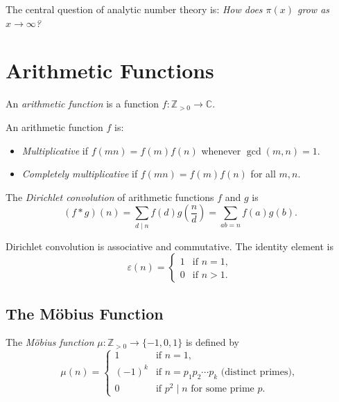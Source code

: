 The central question of analytic number theory is: \emph{How does $\pi(x)$ grow as $x \to \infty$?}

\section{Arithmetic Functions}

\begin{definition}
  An \emph{arithmetic function} is a function $f : \mathbb{Z}_{>0} \to \mathbb{C}$.
\end{definition}

\begin{definition}
  An arithmetic function $f$ is:
  \begin{itemize}
    \item \emph{Multiplicative} if $f(mn) = f(m)f(n)$ whenever $\gcd(m,n) = 1$.
    \item \emph{Completely multiplicative} if $f(mn) = f(m)f(n)$ for all $m, n$.
  \end{itemize}
\end{definition}

\begin{definition}
  The \emph{Dirichlet convolution} of arithmetic functions $f$ and $g$ is
  \begin{equation}
    (f * g)(n) = \sum_{d \mid n} f(d) g\left(\frac{n}{d}\right) = \sum_{ab = n} f(a) g(b).
  \end{equation}
\end{definition}

\begin{proposition}
  Dirichlet convolution is associative and commutative. The identity element is
  \begin{equation}
    \varepsilon(n) = \begin{cases} 1 & \text{if } n = 1, \\ 0 & \text{if } n > 1. \end{cases}
  \end{equation}
\end{proposition}

\subsection{The M\"obius Function}

\begin{definition}
  The \emph{M\"obius function} $\mu : \mathbb{Z}_{>0} \to \{-1, 0, 1\}$ is defined by
  \begin{equation}
    \mu(n) = \begin{cases}
      1      & \text{if } n = 1,                                            \\
      (-1)^k & \text{if } n = p_1 p_2 \cdots p_k \text{ (distinct primes)}, \\
      0      & \text{if } p^2 \mid n \text{ for some prime } p.
    \end{cases}
  \end{equation}
\end{definition}

